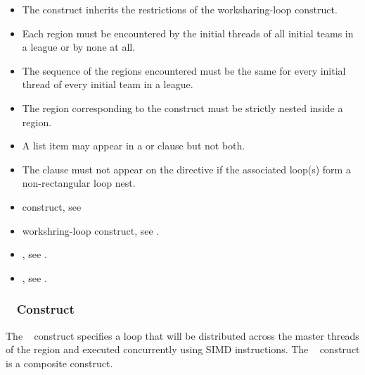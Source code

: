 \begin{itemize}
\item The  construct inherits the restrictions of the worksharing-loop construct.

\item Each  region must be encountered by the initial
threads of all initial teams in a league or by none at all.

\item The sequence of the  regions encountered must
be the same for every initial thread of every initial team in a league.

\item The region corresponding to the  construct must be
strictly nested inside a  region.

\item A list item may appear in a  or  clause but not both.

\item The  clause must not appear on the 
    directive if the associated loop(s) form a non-rectangular loop nest.
\end{itemize}

\crossreferences
\begin{itemize}
\item {} construct, see

\item workshring-loop construct, see
.

\item {}, see .
\item {}, see
.
\end{itemize}





\subsubsection{~ Construct}
\label{subsec:distribute simd Construct}
\summary
The ~ construct specifies a loop that will be distributed across the
master threads of the  region and executed concurrently using SIMD instructions. The ~ construct is a composite construct.

